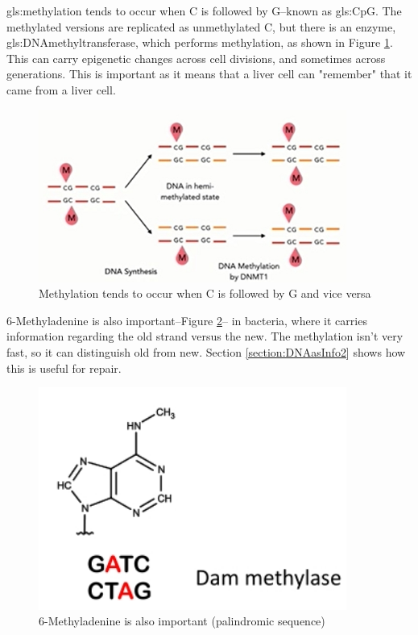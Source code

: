 \documentclass[]{article}
\begin{document}
\Gls{gls:methylation} tends to occur when C is followed by G--known as \gls{gls:CpG}. The methylated versions are replicated as unmethylated C, but there is an enzyme, \gls{gls:DNAmethyltransferase}, which performs methylation, as shown in Figure \ref{fig:5-methylcytosine-in-action}. This can carry epigenetic changes across cell divisions, and sometimes across generations. This is important as it means that a liver cell can "remember" that it came from a liver cell.
\begin{figure}[H]
	\caption{Methylation tends to occur when C is followed by G and vice versa} \label{fig:5-methylcytosine-in-action} 
	\includegraphics[width=0.9\textwidth]{5-methylcytosine-in-action}
\end{figure}

6-Methyladenine is also important--Figure \ref{fig:6-Methyladenine}-- in bacteria, where it carries information regarding the old strand versus the new. The methylation isn't very fast, so it can distinguish old from new. Section \ref{section:DNAasInfo2} shows how this is useful for repair.

\begin{figure}[H]
	\caption{6-Methyladenine is also important (palindromic sequence)} \label{fig:6-Methyladenine} 
	\includegraphics[width=0.9\textwidth]{6-Methyladenine}
\end{figure}
\end{document}
